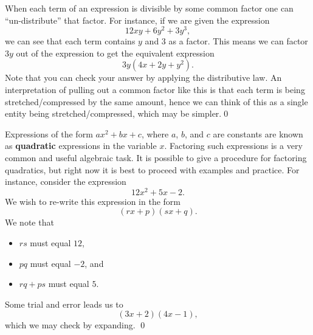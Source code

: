 \par 

\begin{eg} When each term of an expression is divisible by some common factor one can ``un-distribute'' that factor. For instance, if we are given the expression
\[
12xy+6y^2+3y^3,
\]
we can see that each term contains $y$ and $3$ as a factor. This means we can factor $3y$ out of the expression to get the equivalent expression
\[
3y(4x+2y+y^2).
\]
Note that you can check your answer by applying the distributive law. An interpretation of pulling out a common factor like this is that each term is being stretched/compressed by the same amount, hence we can think of this as a single entity being stretched/compressed, which may be simpler.\qed
\end{eg}
\par

\begin{eg} Expressions of the form $ax^2+bx+c$, where $a$, $b$, and $c$ are constants are known as {\bf quadratic} expressions in the variable $x$. Factoring such expressions is a very common and useful algebraic task. It is possible to give a procedure for factoring quadratics, but right now it is best to proceed with examples and practice. For instance, consider the expression
\[
12x^2+5x-2.
\]
We wish to re-write this expression in the form
\[
(rx+p)(sx+q).
\]
We note that
\begin{itemize}
\item $rs$ must equal $12$, 
\item $pq$ must equal $-2$, and
\item $rq + ps$ must equal $5$. 
\end{itemize}
Some trial and error leads us to 
\[
(3x+2)(4x-1),
\]
which we may check by expanding. \qed
\end{eg}



